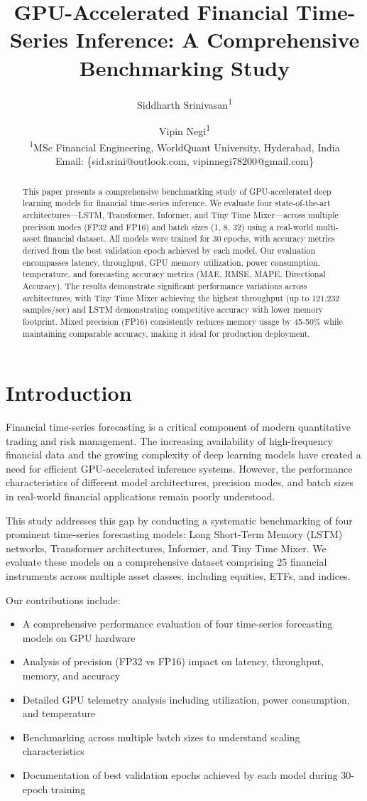 \documentclass[10pt,a4paper]{article}
\title{GPU-Accelerated Financial Time-Series Inference: A Comprehensive Benchmarking Study}
\author{
Siddharth Srinivasan\textsuperscript{1} \and Vipin Negi\textsuperscript{1} \\
\textsuperscript{1}MSc Financial Engineering, WorldQuant University, Hyderabad, India \\
Email: \{sid.srini@outlook.com, vipinnegi78200@gmail.com\}
}
\date{}
\begin{document}
\maketitle

\begin{abstract}
This paper presents a comprehensive benchmarking study of GPU-accelerated deep learning models for financial time-series inference. We evaluate four state-of-the-art architectures—LSTM, Transformer, Informer, and Tiny Time Mixer—across multiple precision modes (FP32 and FP16) and batch sizes (1, 8, 32) using a real-world multi-asset financial dataset. All models were trained for 30 epochs, with accuracy metrics derived from the best validation epoch achieved by each model. Our evaluation encompasses latency, throughput, GPU memory utilization, power consumption, temperature, and forecasting accuracy metrics (MAE, RMSE, MAPE, Directional Accuracy). The results demonstrate significant performance variations across architectures, with Tiny Time Mixer achieving the highest throughput (up to 121,232 samples/sec) and LSTM demonstrating competitive accuracy with lower memory footprint. Mixed precision (FP16) consistently reduces memory usage by 45-50\% while maintaining comparable accuracy, making it ideal for production deployment.
\end{abstract}

\section{Introduction}
Financial time-series forecasting is a critical component of modern quantitative trading and risk management. The increasing availability of high-frequency financial data and the growing complexity of deep learning models have created a need for efficient GPU-accelerated inference systems. However, the performance characteristics of different model architectures, precision modes, and batch sizes in real-world financial applications remain poorly understood.

This study addresses this gap by conducting a systematic benchmarking of four prominent time-series forecasting models: Long Short-Term Memory (LSTM) networks, Transformer architectures, Informer, and Tiny Time Mixer. We evaluate these models on a comprehensive dataset comprising 25 financial instruments across multiple asset classes, including equities, ETFs, and indices.

Our contributions include:
\begin{itemize}
    \item A comprehensive performance evaluation of four time-series forecasting models on GPU hardware
    \item Analysis of precision (FP32 vs FP16) impact on latency, throughput, memory, and accuracy
    \item Detailed GPU telemetry analysis including utilization, power consumption, and temperature
    \item Benchmarking across multiple batch sizes to understand scaling characteristics
    \item Documentation of best validation epochs achieved by each model during 30-epoch training
\end{itemize}
\end{document}
